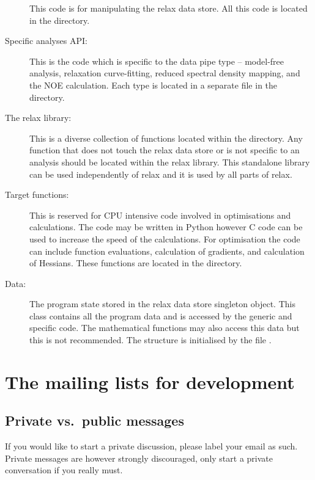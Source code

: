 \begin{description}
    This code is for manipulating the relax data store.
    All this code is located in the  directory.
  \item[Specific analyses API:]  This is the code which is specific to the data pipe type -- model-free analysis, relaxation curve-fitting, reduced spectral density mapping, and the NOE calculation.
    Each type is located in a separate file in the  directory.
  \item[The relax library:]  This is a diverse collection of functions located within the  directory.
      Any function that does not touch the relax data store or is not specific to an analysis should be located within the relax library.
      This standalone library can be used independently of relax and it is used by all parts of relax.
  \item[Target functions:]  This is reserved for CPU intensive code involved in optimisations and calculations.
    The code may be written in Python however C code can be used to increase the speed of the calculations.
    For optimisation the code can include function evaluations, calculation of gradients, and calculation of Hessians.
    These functions are located in the  directory.
  \item[Data:]  The program state stored in the relax data store singleton object.
    This class contains all the program data and is accessed by the generic and specific code.
    The mathematical functions may also access this data but this is not recommended.  The structure is initialised by the file .
\end{description}





\section{The mailing lists for development}


\subsection{Private vs.\ public messages}

If you would like to start a private discussion, please label your email as such.
Private messages are however strongly discouraged, only start a private conversation if you really must.

